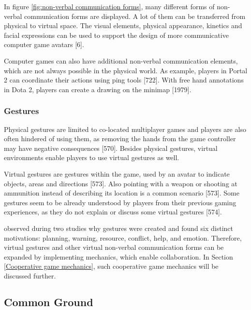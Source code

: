 In figure \ref{fig:non-verbal communication forms}, many different forms of non-verbal communication forms are displayed. A lot of them can be transferred from physical to virtual space. The visual elements, physical appearance, kinetics and facial expressions can be used to support the design of more communicative computer game avatars \autocite{Kujanpaa2003SupportingAvatars}[6].

Computer games can also have additional non-verbal communication elements, which are not always possible in the physical world. As example, players in Portal 2 can coordinate their actions using ping tools \autocite{Vaddi2015Validating2}[722]. With free hand annotations in Dota 2, players can create a drawing on the minimap \autocite{Wuertz2017Why2}[1979].


\subsubsection{Gestures}

Physical gestures are limited to co-located multiplayer games and players are also often hindered of using them, as removing the hands from the game controller may have negative consequences \autocite{Cheung2012CommunicationGaming}[570]. Besides physical gestures, virtual environments enable players to use virtual gestures as well.

Virtual gestures are gestures within the game, used by an avatar to indicate objects, areas and directions \autocite{Cheung2012CommunicationGaming}[573].
Also pointing with a weapon or shooting at ammunition instead of describing its location is a common scenario \autocite{Cheung2012CommunicationGaming}[573]. Some gestures seem to be already understood by players from their previous gaming experiences, as they do not explain or discuss some virtual gestures \autocite{Cheung2012CommunicationGaming}[574].

\textcite{Wuertz2017Why2} observed during two studies why gestures were created and found six distinct motivations: planning, warning, resource, conflict, help, and emotion.
Therefore, virtual gestures and other virtual non-verbal communication forms can be expanded by implementing mechanics, which enable collaboration. In Section \ref{Cooperative game mechanics}, such cooperative game mechanics will be discussed further.

\subsection{Common Ground}
\label{section:Common Ground}

